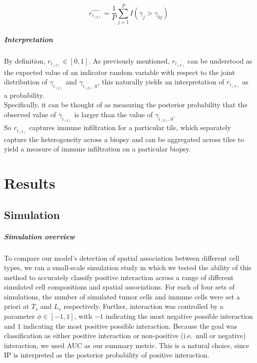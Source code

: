 \documentclass[
]{book}
\begin{document}
\begin{equation}
\label{eqn:CTIP_EST}
    \widehat{r_{i_{(k)}}} = \frac{1}{P} \sum_{j=1}^P I(\gamma_j > \gamma_{0j})
    \tag{6}
\end{equation}

\paragraph{\textbf{Interpretation}}

By definition, \(r_{i_{(k)}} \in [0, 1]\). As previously mentioned, \(r_{i_{(k)}}\) can be
understood as the expected value of an indicator random variable
with respect to the joint distribution of \(\gamma_{i_{(k)}}\)
and \(\gamma_{i_{(k)},0}\), this naturally yields
an interpretation of \(r_{i_{(k)}}\) as a probability.\\
Specifically, it can be thought of as measuring the posterior
probability that the observed value of \(\gamma_{i_{(k)}}\)
is larger than the value of \(\gamma_{i_{(k)},0}\).\\
So \(r_{i_{(k)}}\) captures immune infiltration for a particular tile, which separately capture the heterogeneity across a biopsy and can be
aggregated across tiles to yield a measure of immune infiltration
on a particular biopsy.

\hypertarget{results}{%
\chapter{Results}\label{results}}

\hypertarget{simulation}{%
\section{Simulation}\label{simulation}}

\paragraph{\textbf{Simulation overview}}

To compare our model's detection of spatial association between
different cell types, we ran a small-scale simulation study in
which we tested the ability of this method to accurately classify
positive interaction across a range of different simulated cell
compositions and spatial associations. For each of four sets of
simulations, the number of simulated tumor cells and immune cells
were set a priori at \(T_s\) and \(L_s\) respectively. Further,
interaction was controlled by a parameter \(\phi \in [-1, 1]\),
with \(-1\) indicating the most negative possible interaction and
\(1\) indicating the most positive possible interaction. Because
the goal was classification as either positive interaction or
non-positive (i.e.~null or negative) interaction, we used AUC
as our summary metric. This is a natural choice, since IP
is interpreted as the posterior probability of positive
interaction.
\end{document}
